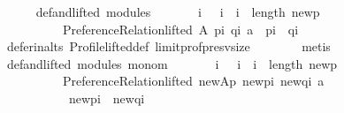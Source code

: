 \begin{isabellebody}
\ \ \ \ \isamarkupfalse%
\ def{\isacharunderscore}{\kern0pt}and{\isacharunderscore}{\kern0pt}lifted\ modules\ \isamarkupfalse%
\isanewline
\ \ \ \ \ \ {\isachardoublequoteopen}{\isasymforall}i{\isachardot}{\kern0pt}\ {\isacharparenleft}{\kern0pt}{}\ {\isasymle}\ i\ {\isasymand}\ i\ {\isacharless}{\kern0pt}\ length\ {\isacharquery}{\kern0pt}new{\isacharunderscore}{\kern0pt}p{\isacharparenright}{\kern0pt}\ {\isasymlongrightarrow}\isanewline
\ \ \ \ \ \ \ \ \ \ {\isacharparenleft}{\kern0pt}Preference{\isacharunderscore}{\kern0pt}Relation{\isachardot}{\kern0pt}lifted\ A\ {\isacharparenleft}{\kern0pt}p{\isacharbang}{\kern0pt}i{\isacharparenright}{\kern0pt}\ {\isacharparenleft}{\kern0pt}q{\isacharbang}{\kern0pt}i{\isacharparenright}{\kern0pt}\ a\ {\isasymor}\ {\isacharparenleft}{\kern0pt}p{\isacharbang}{\kern0pt}i{\isacharparenright}{\kern0pt}\ {\isacharequal}{\kern0pt}\ {\isacharparenleft}{\kern0pt}q{\isacharbang}{\kern0pt}i{\isacharparenright}{\kern0pt}{\isacharparenright}{\kern0pt}{\isachardoublequoteclose}\isanewline
\ \ \ \ \ \ \isamarkupfalse%
\ defer{\isacharunderscore}{\kern0pt}in{\isacharunderscore}{\kern0pt}alts\ Profile{\isachardot}{\kern0pt}lifted{\isacharunderscore}{\kern0pt}def\ limit{\isacharunderscore}{\kern0pt}prof{\isacharunderscore}{\kern0pt}presv{\isacharunderscore}{\kern0pt}size\isanewline
\ \ \ \ \ \ \isamarkupfalse%
\ metis\isanewline
\ \ \ \ \isamarkupfalse%
\ def{\isacharunderscore}{\kern0pt}and{\isacharunderscore}{\kern0pt}lifted\ modules\ mono{\isacharunderscore}{\kern0pt}m\ \isamarkupfalse%
\isanewline
\ \ \ \ \ \ {\isachardoublequoteopen}{\isasymforall}i{\isachardot}{\kern0pt}\ {\isacharparenleft}{\kern0pt}{}\ {\isasymle}\ i\ {\isasymand}\ i\ {\isacharless}{\kern0pt}\ length\ {\isacharquery}{\kern0pt}new{\isacharunderscore}{\kern0pt}p{\isacharparenright}{\kern0pt}\ {\isasymlongrightarrow}\isanewline
\ \ \ \ \ \ \ \ \ \ {\isacharparenleft}{\kern0pt}Preference{\isacharunderscore}{\kern0pt}Relation{\isachardot}{\kern0pt}lifted\ {\isacharquery}{\kern0pt}new{\isacharunderscore}{\kern0pt}Ap\ {\isacharparenleft}{\kern0pt}{\isacharquery}{\kern0pt}new{\isacharunderscore}{\kern0pt}p{\isacharbang}{\kern0pt}i{\isacharparenright}{\kern0pt}\ {\isacharparenleft}{\kern0pt}{\isacharquery}{\kern0pt}new{\isacharunderscore}{\kern0pt}q{\isacharbang}{\kern0pt}i{\isacharparenright}{\kern0pt}\ a\ {\isasymor}\isanewline
\ \ \ \ \ \ \ \ \ \ \ {\isacharparenleft}{\kern0pt}{\isacharquery}{\kern0pt}new{\isacharunderscore}{\kern0pt}p{\isacharbang}{\kern0pt}i{\isacharparenright}{\kern0pt}\ {\isacharequal}{\kern0pt}\ {\isacharparenleft}{\kern0pt}{\isacharquery}{\kern0pt}new{\isacharunderscore}{\kern0pt}q{\isacharbang}{\kern0pt}i{\isacharparenright}{\kern0pt}{\isacharparenright}{\kern0pt}{\isachardoublequoteclose}\isanewline

\end{isabellebody}
